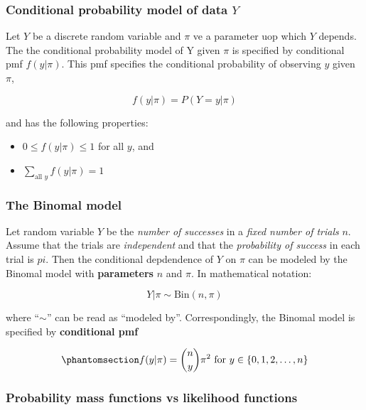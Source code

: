 \documentclass[
  letterpaper,
  DIV=11,
  numbers=noendperiod]{scrartcl}
\theoremstyle{definition}
\theoremstyle{remark}
\begin{document}
\subsubsection{\texorpdfstring{Conditional probability model of data
\(Y\)}{Conditional probability model of data Y}}\label{conditional-probability-model-of-data-y}

Let \(Y\) be a discrete random variable and \(\pi\) ve a parameter uop
which \(Y\) depends. The the conditional probability model of Y given
\(\pi\) is specified by conditional pmf \(f(y|\pi)\). This pmf specifies
the conditional probability of observing \(y\) given \(\pi\),

\[
f(y|\pi) = P(Y = y | \pi)
\]

and has the following properties:

\begin{itemize}
\item
  \(0 \leq f(y|\pi) \leq 1\) for all \(y\), and
\item
  \(\sum_{\text{all } y}f(y|\pi) = 1\)
\end{itemize}

\subsubsection{The Binomal model}\label{the-binomal-model}

Let random variable \(Y\) be the \emph{number of successes} in a
\emph{fixed number of trials} \(n\). Assume that the trials are
\emph{independent} and that the \emph{probability of success} in each
trial is \(pi\). Then the conditional depdendence of \(Y\) on \(\pi\)
can be modeled by the Binomal model with \textbf{parameters} \(n\) and
\(\pi\). In mathematical notation:

\[
Y|\pi \sim \text{Bin}(n, \pi)
\]

where ``\(\sim\)'' can be read as ``modeled by''. Correspondingly, the
Binomal model is specified by \textbf{conditional pmf}

\begin{equation}\phantomsection\label{eq-27}{
f(y|\pi) = \binom{n}{y} \pi ^2 \text{ for } y \in \{0,1,2, \dots ,n\}
}\end{equation}

\subsubsection{Probability mass functions vs likelihood
functions}\label{probability-mass-functions-vs-likelihood-functions}
\end{document}
